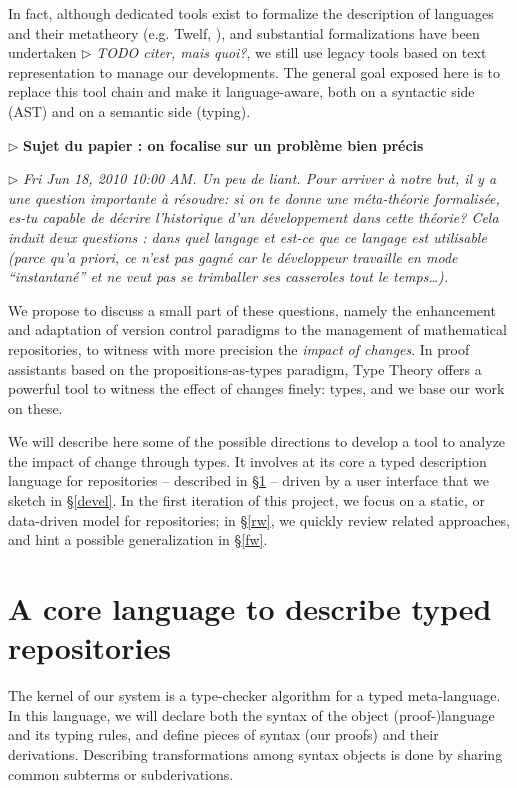\documentclass{article}
\newcommand{\remplan}[1]{\noindent\textcolor{bwblue}{$\triangleright$ \textbf{#1}}}
\newcommand{\remtext}[1]{\textcolor{bwgreen}{$\triangleright$ \textsl{#1}}}
\begin{document}
In fact, although dedicated tools exist to formalize the description
of languages and their metatheory (e.g. \textsf{Twelf},
{\cite{pfenning1999system}}), and substantial formalizations have been
undertaken \remtext{TODO citer, mais quoi?}, we still use legacy tools
based on text representation to manage our developments. The general
goal exposed here is to replace this tool chain and make it
language-aware, both on a syntactic side (AST) and on a semantic side
(typing).

\remplan{Sujet du papier : on focalise sur un problème bien précis}

\remtext{Fri Jun 18, 2010 10:00 AM.
  Un peu de liant. Pour arriver à notre but, il y a une
  question importante à résoudre: si on te donne une méta-théorie
  formalisée, es-tu capable de décrire l'historique d'un développement
  dans cette théorie? Cela induit deux questions : dans quel langage
  et est-ce que ce langage est utilisable (parce qu'a priori, ce n'est
  pas gagné car le développeur travaille en mode ``instantané'' et ne
  veut pas se trimballer ses casseroles tout le temps\ldots).}

We propose to discuss a small part of these questions, namely the
enhancement and adaptation of version control paradigms to the
management of mathematical repositories, to witness with more
precision the \emph{impact of changes}. In proof assistants based on
the propositions-as-types paradigm, Type Theory offers a powerful tool
to witness the effect of changes finely: types, and we base our work
on these.

We will describe here some of the possible directions to develop a
tool to analyze the impact of change through types. It involves at its
core a typed description language for repositories -- described in
\S\ref{kernel} -- driven by a user interface that we sketch in
\S\ref{devel}. In the first iteration of this project, we focus on a
static, or data-driven model for repositories; in \S\ref{rw}, we
quickly review related approaches, and hint a possible generalization
in \S\ref{fw}.

\section{A core language to describe typed repositories}
\label{kernel}

The kernel of our system is a type-checker algorithm for a typed
meta-language. In this language, we will declare both the syntax of
the object (proof-)language and its typing rules, and define pieces of
syntax (our proofs) and their derivations. Describing transformations
among syntax objects is done by sharing common subterms or
subderivations.
\end{document}
